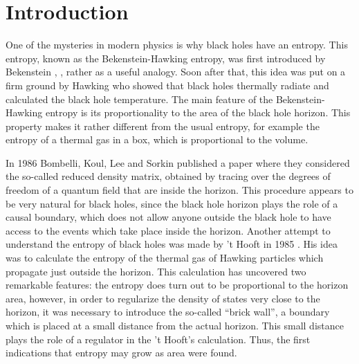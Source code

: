 \documentclass[12pt]{article}
\begin{document}
\section{Introduction}
\label{section:introduction}

One of the mysteries in  modern physics is why  black holes have an entropy. This entropy, known as the Bekenstein-Hawking entropy, was first introduced by Bekenstein   
\cite{Bekenstein:1972tm}, \cite{Bekenstein:1973ur}, \cite{Bekenstein:1974ax} rather as a useful analogy. Soon after that, this idea   was put on a firm ground by Hawking  \cite{Hawking:1974sw} who showed that black holes thermally radiate and calculated the black hole temperature. 
The main feature of the Bekenstein-Hawking entropy  is its proportionality to the area of the black hole horizon. This property makes it rather different from the usual entropy, for example the entropy of a thermal gas in a box, which is proportional to the volume.

In 1986 Bombelli, Koul, Lee and Sorkin \cite{Bombelli:1986rw} published a paper where they considered  the so-called  reduced density matrix, obtained by 
tracing over the degrees of freedom of 
a quantum field that are inside the horizon. This procedure appears to be very natural for black holes, since the  black hole horizon plays the role of a causal boundary, which does not allow  anyone outside the black hole to have access to the events which take place inside the horizon. Another attempt to understand the entropy of black holes was made by
't Hooft in 1985 \cite{'tHooft:1984re}. His idea  was to calculate the entropy of the thermal gas of Hawking particles which propagate just outside the horizon. This calculation has uncovered two remarkable features: the entropy does turn out to be proportional to the horizon area, however, in order to regularize the density of states very close to the horizon, 
it was necessary to introduce the so-called ``brick wall'', a boundary  which is placed at a small distance from the actual horizon. This small distance plays the role of a regulator in the 't Hooft's calculation. Thus, the first indications that entropy may grow as area were found.
\end{document}
